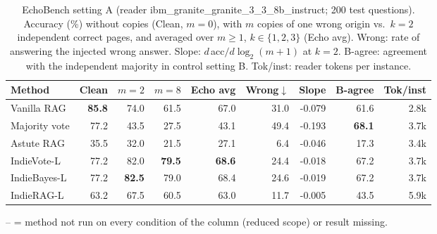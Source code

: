 \begin{table}[tbp]
\centering
\small
\caption{EchoBench setting A (reader ibm\_granite\_granite\_3\_3\_8b\_instruct; 200 test questions). Accuracy (\%) without copies (Clean, $m{=}0$), with $m$ copies of one wrong origin vs.\ $k{=}2$ independent correct pages, and averaged over $m\geq1$, $k\in\{1,2,3\}$ (Echo avg). Wrong: rate of answering the injected wrong answer. Slope: $d\,$acc$/d\log_2(m{+}1)$ at $k{=}2$. B-agree: agreement with the independent majority in control setting B. Tok/inst: reader tokens per instance.}
\label{tab:main:ibm_granite_granite_3_3_8b_instruct}
\setlength{\tabcolsep}{4pt}
\begin{tabular}{lrrrrrrrr}
\toprule
Method & Clean & $m{=}2$ & $m{=}8$ & Echo avg & Wrong$\downarrow$ & Slope & B-agree & Tok/inst \\
\midrule
Vanilla RAG & \textbf{85.8} & 74.0 & 61.5 & 67.0 & 31.0 & -0.079 & 61.6 & 2.8k \\
Majority vote & 77.2 & 43.5 & 27.5 & 43.1 & 49.4 & -0.193 & \textbf{68.1} & 3.7k \\
Astute RAG & 35.5 & 32.0 & 21.5 & 27.1 & 6.4 & -0.046 & 17.3 & 3.4k \\
\midrule
IndieVote-L & 77.2 & 82.0 & \textbf{79.5} & \textbf{68.6} & 24.4 & -0.018 & 67.2 & 3.7k \\
IndieBayes-L & 77.2 & \textbf{82.5} & 79.0 & 68.4 & 24.6 & -0.019 & 67.2 & 3.7k \\
IndieRAG-L & 63.2 & 67.5 & 60.5 & 63.0 & 11.7 & -0.005 & 43.5 & 5.9k \\
\bottomrule
\end{tabular}
\par\smallskip\parbox{\linewidth}{\footnotesize -- = method not run on every condition of the column (reduced scope) or result missing.}
\end{table}
